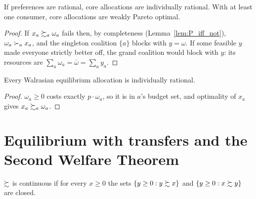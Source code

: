 \begin{theorem}
\label{thm:core_props}
\leanok
{}
If preferences are rational, core allocations are individually rational. With at least one consumer, core allocations
are weakly Pareto optimal.
\end{theorem}
\begin{proof}
\leanok
If $x_a \succsim_a \omega_a$ fails then, by completeness (Lemma~\ref{lem:P_iff_not}), $\omega_a \succ_a x_a$, and the
singleton coalition $\{a\}$ blocks with $y = \omega$. If some feasible $y$ made everyone strictly better off, the grand
coalition would block with $y$: its resources are $\sum_a \omega_a = \bar\omega = \sum_a y_a$.
\end{proof}

\begin{theorem}
\label{thm:eq_ir}
\leanok
{}
Every Walrasian equilibrium allocation is individually rational.
\end{theorem}
\begin{proof}
\leanok
$\omega_a \ge 0$ costs exactly $p \cdot \omega_a$, so it is in $a$'s budget set, and optimality of $x_a$ gives
$x_a \succsim_a \omega_a$.
\end{proof}

\section{Equilibrium with transfers and the Second Welfare Theorem}
\label{sec:second_welfare}

\begin{definition}
\label{def:continuousPref}
\leanok
$\succsim$ is continuous if for every $x \ge 0$ the sets $\{y \ge 0 : y \succsim x\}$ and $\{y \ge 0 : x \succsim y\}$ are
closed.
\end{definition}

